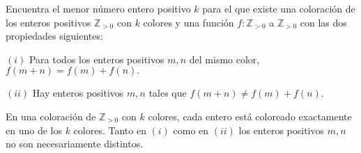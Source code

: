Encuentra el menor número entero positivo $k$ para el que existe una coloración de los enteros positivos $\mathbb{Z}_{>0}$ con $k$ colores y una función $f:\mathbb{Z}_{\gt 0}$ a $\mathbb{Z}_{\gt 0}$ con las dos propiedades siguientes:

$(i)$ Para todos los enteros positivos $m,n$ del mismo color, $f(m+n)=f(m)+f(n).$  

$(ii)$ Hay enteros positivos $m,n$ tales que $f(m+n)\neq f(m)+f(n).$

En una coloración de $\mathbb{Z}_{\gt 0}$ con $k$ colores, cada entero está coloreado exactamente en uno de los $k$ colores. Tanto en $(i)$ como en $(ii)$ los enteros positivos $m,n$ no son necesariamente distintos.